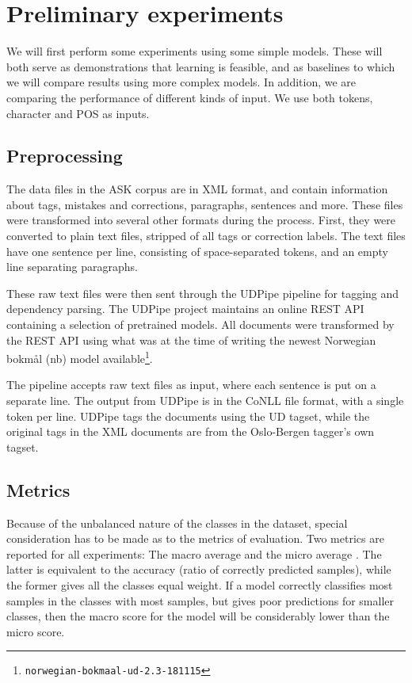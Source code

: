 \chapter{Preliminary experiments}

We will first perform some experiments using some simple models. These will
both serve as demonstrations that learning is feasible, and as baselines
to which we will compare results using more complex models. In addition,
we are comparing the performance of different kinds of input. We use both
tokens, character \ngrams and \ac{POS} \ngrams as inputs.


\section{Preprocessing}

The data files in the ASK corpus are in \ac{XML} format, and contain information
about tags, mistakes and corrections, paragraphs, sentences and more. These
files were transformed into several other formats during the process. First,
they were converted to plain text files, stripped of all tags or correction
labels. The text files have one sentence per line, consisting of
space-separated tokens, and an empty line separating paragraphs.

These raw text files were then sent through the UDPipe pipeline
\autocite{udpipe:2017} for tagging and dependency parsing. The UDPipe project
maintains an online REST \ac{API} containing a selection of pretrained models.
All documents were transformed by the REST \ac{API} using what was at
the time of writing the newest Norwegian bokmål (nb) model
available\footnote{\texttt{norwegian-bokmaal-ud-2.3-181115}}.

The pipeline accepts raw text files as input, where each sentence is put on a
separate line. The output from UDPipe is in the CoNLL file format, with a
single token per line. UDPipe tags the documents using the UD tagset, while
the original tags in the \ac{XML} documents are from the Oslo-Bergen tagger's own
tagset.


\section{Metrics}

Because of the unbalanced nature of the classes in the dataset, special
consideration has to be made as to the metrics of evaluation. Two metrics are
reported for all experiments: The macro average \FI and the micro average \FI.
The latter is equivalent to the accuracy (ratio of correctly predicted
samples), while the former gives all the classes equal weight. If a model
correctly classifies most samples in the classes with most samples, but gives
poor predictions for smaller classes, then the macro \FI score for the model
will be considerably lower than the micro \FI score.


